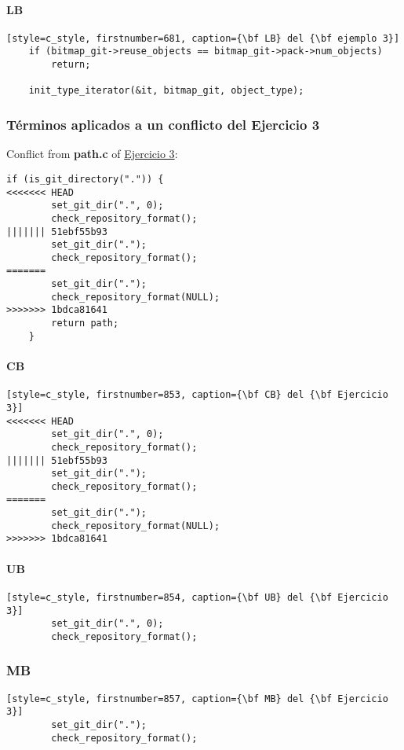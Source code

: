 \paragraph{LB}
\begin{lstlisting}[style=c_style, firstnumber=681, caption={\bf LB} del {\bf ejemplo 3}]
	if (bitmap_git->reuse_objects == bitmap_git->pack->num_objects)
		return;

	init_type_iterator(&it, bitmap_git, object_type);
\end{lstlisting}

\subsubsection{Términos aplicados a un conflicto del Ejercicio 3}
Conflict from {\bf path.c} of \hyperref[exercise_03]{Ejercicio 3}:

\begin{lstlisting}[style=c_style, firstnumber=852, caption=Conflicto en {\bf path.c} del {\bf Ejercicio 3}]
	if (is_git_directory(".")) {
<<<<<<< HEAD
		set_git_dir(".", 0);
		check_repository_format();
||||||| 51ebf55b93
		set_git_dir(".");
		check_repository_format();
=======
		set_git_dir(".");
		check_repository_format(NULL);
>>>>>>> 1bdca81641
		return path;
	}
\end{lstlisting}


\paragraph{CB}
\begin{lstlisting}[style=c_style, firstnumber=853, caption={\bf CB} del {\bf Ejercicio 3}]
<<<<<<< HEAD
		set_git_dir(".", 0);
		check_repository_format();
||||||| 51ebf55b93
		set_git_dir(".");
		check_repository_format();
=======
		set_git_dir(".");
		check_repository_format(NULL);
>>>>>>> 1bdca81641
\end{lstlisting}


\paragraph{UB}
\begin{lstlisting}[style=c_style, firstnumber=854, caption={\bf UB} del {\bf Ejercicio 3}]
		set_git_dir(".", 0);
		check_repository_format();
\end{lstlisting}

\subsubsection*{MB}
\begin{lstlisting}[style=c_style, firstnumber=857, caption={\bf MB} del {\bf Ejercicio 3}]
		set_git_dir(".");
		check_repository_format();
\end{lstlisting}


